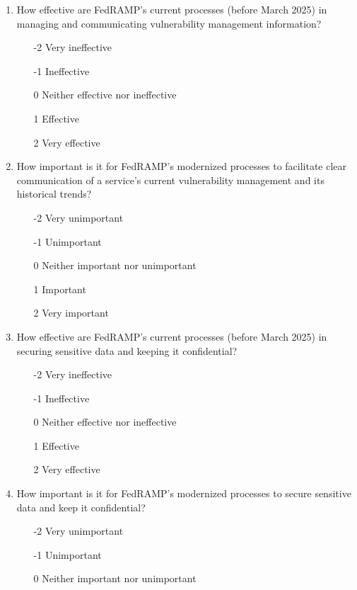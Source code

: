 \documentclass{jdf}
\begin{document}
\begin{enumerate}
\begin{enumerate}
    \end{enumerate}
    \item How effective are FedRAMP's current processes (before March 2025) in managing and communicating vulnerability management information?
    \begin{enumerate}
        \item [-2] Very ineffective
        \item [-1] Ineffective
        \item  [0] Neither effective nor ineffective
        \item  [1] Effective 
        \item  [2] Very effective
    \end{enumerate}
    \item How important is it for FedRAMP's modernized processes to facilitate clear communication of a service's current vulnerability management and its historical trends?
    \begin{enumerate}
        \item [-2] Very unimportant
        \item [-1] Unimportant
        \item  [0] Neither important nor unimportant
        \item  [1] Important
        \item  [2] Very important
    \end{enumerate}
    \item How effective are FedRAMP's current processes (before March 2025) in securing sensitive data and keeping it confidential?
    \begin{enumerate}
        \item [-2] Very ineffective
        \item [-1] Ineffective
        \item  [0] Neither effective nor ineffective
        \item  [1] Effective 
        \item  [2] Very effective
    \end{enumerate}
    \item How important is it for FedRAMP's modernized processes to secure sensitive data and keep it confidential?
    \begin{enumerate}
        \item [-2] Very unimportant
        \item [-1] Unimportant
        \item  [0] Neither important nor unimportant

\end{enumerate}
\end{enumerate}
\end{document}
